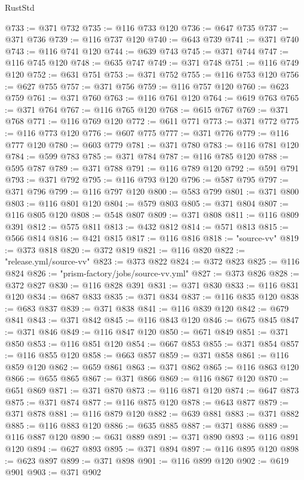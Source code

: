 \begin{lexlean}{RustStd}
\begin{coremodule}
@733 := @371 @732
@735 := @116 @733 @120
@736 := @647 @735
@737 := @371 @736
@739 := @116 @737 @120
@740 := @643 @739
@741 := @371 @740
@743 := @116 @741 @120
@744 := @639 @743
@745 := @371 @744
@747 := @116 @745 @120
@748 := @635 @747
@749 := @371 @748
@751 := @116 @749 @120
@752 := @631 @751
@753 := @371 @752
@755 := @116 @753 @120
@756 := @627 @755
@757 := @371 @756
@759 := @116 @757 @120
@760 := @623 @759
@761 := @371 @760
@763 := @116 @761 @120
@764 := @619 @763
@765 := @371 @764
@767 := @116 @765 @120
@768 := @615 @767
@769 := @371 @768
@771 := @116 @769 @120
@772 := @611 @771
@773 := @371 @772
@775 := @116 @773 @120
@776 := @607 @775
@777 := @371 @776
@779 := @116 @777 @120
@780 := @603 @779
@781 := @371 @780
@783 := @116 @781 @120
@784 := @599 @783
@785 := @371 @784
@787 := @116 @785 @120
@788 := @595 @787
@789 := @371 @788
@791 := @116 @789 @120
@792 := @591 @791
@793 := @371 @792
@795 := @116 @793 @120
@796 := @587 @795
@797 := @371 @796
@799 := @116 @797 @120
@800 := @583 @799
@801 := @371 @800
@803 := @116 @801 @120
@804 := @579 @803
@805 := @371 @804
@807 := @116 @805 @120
@808 := @548 @807
@809 := @371 @808
@811 := @116 @809 @391
@812 := @575 @811
@813 := @432 @812
@814 := @571 @813
@815 := @566 @814
@816 := @421 @815
@817 := @116 @816
@818 := "source-vv"
@819 := @373 @818
@820 := @372 @819
@821 := @116 @820
@822 := "release.yml/source-vv"
@823 := @373 @822
@824 := @372 @823
@825 := @116 @824
@826 := "prism-factory/jobs/source-vv.yml"
@827 := @373 @826
@828 := @372 @827
@830 := @116 @828 @391
@831 := @371 @830
@833 := @116 @831 @120
@834 := @687 @833
@835 := @371 @834
@837 := @116 @835 @120
@838 := @683 @837
@839 := @371 @838
@841 := @116 @839 @120
@842 := @679 @841
@843 := @371 @842
@845 := @116 @843 @120
@846 := @675 @845
@847 := @371 @846
@849 := @116 @847 @120
@850 := @671 @849
@851 := @371 @850
@853 := @116 @851 @120
@854 := @667 @853
@855 := @371 @854
@857 := @116 @855 @120
@858 := @663 @857
@859 := @371 @858
@861 := @116 @859 @120
@862 := @659 @861
@863 := @371 @862
@865 := @116 @863 @120
@866 := @655 @865
@867 := @371 @866
@869 := @116 @867 @120
@870 := @651 @869
@871 := @371 @870
@873 := @116 @871 @120
@874 := @647 @873
@875 := @371 @874
@877 := @116 @875 @120
@878 := @643 @877
@879 := @371 @878
@881 := @116 @879 @120
@882 := @639 @881
@883 := @371 @882
@885 := @116 @883 @120
@886 := @635 @885
@887 := @371 @886
@889 := @116 @887 @120
@890 := @631 @889
@891 := @371 @890
@893 := @116 @891 @120
@894 := @627 @893
@895 := @371 @894
@897 := @116 @895 @120
@898 := @623 @897
@899 := @371 @898
@901 := @116 @899 @120
@902 := @619 @901
@903 := @371 @902

\end{coremodule}
\end{lexlean}
